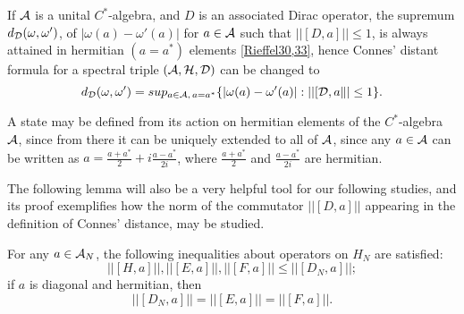 \begin{remark}
If $\mathcal A$ is a unital $C^*$-algebra, and $D$ is an associated Dirac operator, the supremum  $d_\mathcal D(\omega, \omega')$, of $|\omega(a) - \omega'(a)|$ for $a \in \mathcal A$ such that $||[D, a]|| \leq 1$, is always attained in hermitian $(a = a^*)$ elements \ref{Rieffel30,33}, hence Connes' distant formula for a spectral triple $(\mathcal A, \mathcal H, \mathcal D)$ can be changed to
\begin{equation} \label{distanceFormulaHermitian}
    d_\mathcal D(\omega, \omega') = sup_{a \in \mathcal A, \,a = a^*} \{|\omega(a) - \omega'(a)| : ||[\mathcal D, a\|| \leq 1\}.
\end{equation}
\end{remark}

\begin{remark}
A state may be defined from its action on hermitian elements of the $C^*$-algebra $\mathcal A$, since from there it can be uniquely extended to all of $\mathcal A$, since any $a \in \mathcal A$ can be written as $a = \frac{a+a^*}{2} + i \frac{a - a^*}{2i}$, where $\frac{a+a^*}{2}$ and $\frac{a-a^*}{2i}$ are hermitian.
\end{remark}

The following lemma will also be a very helpful tool for our following  studies, and its proof exemplifies how the norm of the commutator $||[D, a]||$ appearing in the definition of Connes' distance, may be studied.

\begin{lemma}
For any $a \in \mathcal A_N$, the following inequalities about operators on $H_N$ are satisfied:
\begin{equation} \label{ineqDN}
    ||[H, a]||, ||[E, a]||, ||[F, a]||  \leq ||[D_N, a]||;
\end{equation} \label{eqDNdiag}
if $a$ is diagonal and hermitian, then
\begin{equation}
    ||[D_N, a]|| = ||[E, a]|| = ||[F, a]||.
\end{equation}
\end{lemma}

